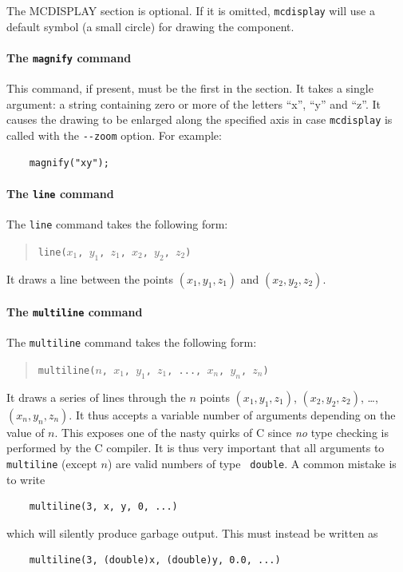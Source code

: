 The MCDISPLAY section is optional. If it is omitted, \verb+mcdisplay+
will use a default symbol (a small circle) for drawing the component.

\paragraph{The {\tt magnify} command}

This command, if present, must be the first in the section. It takes a
single argument: a string containing zero or more of the letters ``x'',
``y'' and ``z''. It causes the drawing to be enlarged along the
specified axis in case \verb+mcdisplay+ is called with the \verb+--zoom+
option. For example:
\begin{verbatim}
    magnify("xy");
\end{verbatim}


\paragraph{The {\tt line} command}

The {\tt line} command takes the following form:
\begin{quote}
  \texttt{line($x_1$, $y_1$, $z_1$, $x_2$, $y_2$, $z_2$)}
\end{quote}
It draws a line between the points $(x_1, y_1, z_1)$ and $(x_2, y_2,
z_2)$.


\paragraph{The {\tt multiline} command}

The {\tt multiline} command takes the following form:
\begin{quote}
  \texttt{multiline($n$, $x_1$, $y_1$, $z_1$, ..., $x_n$, $y_n$, $z_n$)}
\end{quote}
It draws a series of lines through the $n$ points $(x_1, y_1, z_1)$,
$(x_2, y_2, z_2)$, \ldots, $(x_n, y_n, z_n)$. It thus accepts a variable
number of arguments depending on the value of $n$. This exposes
one of the nasty quirks of C since \emph{no} type checking is
performed by the C compiler. It is thus very important that all
arguments to {\tt multiline} (except $n$) are valid numbers of type {\tt
  double}. A common mistake is to write
\begin{verbatim}
    multiline(3, x, y, 0, ...)
\end{verbatim}
which will silently produce garbage output. This must instead be
written as
\begin{verbatim}
    multiline(3, (double)x, (double)y, 0.0, ...)
\end{verbatim}


